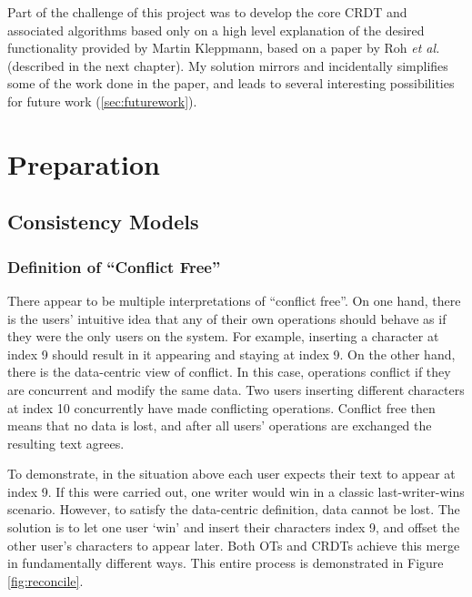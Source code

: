 \documentclass[12pt,a4paper,twoside,openright]{report}
\begin{document}
Part of the challenge of this project was to develop the core CRDT and associated algorithms based only on a high level explanation of the desired functionality provided by Martin Kleppmann, based on a paper by Roh \textit{et al.}~\cite{roh2011replicated} (described in the next chapter). My solution mirrors and incidentally simplifies some of the work done in the paper, and leads to several interesting possibilities for future work (\cref{sec:futurework}). 


\chapter{Preparation}


\section{Consistency Models}

	\subsection{Definition of ``Conflict Free''}
	
	There appear to be multiple interpretations of ``conflict free''. On one hand, there is the users' intuitive idea that any of their own operations should behave as if they were the only users on the system. For example, inserting a character at index 9 should result in it appearing and staying at index 9. On the other hand, there is the data-centric view of conflict. In this case, operations conflict if they are concurrent and modify the same data. Two users inserting different characters at index 10 concurrently have made conflicting operations. Conflict free then means that no data is lost, and after all users' operations are exchanged the resulting text agrees.
	
	To demonstrate, in the situation above each user expects their text to appear at index 9. If this were carried out, one writer would win in a classic last-writer-wins scenario. However, to satisfy the data-centric definition, data cannot be lost. The solution is to let one user `win' and insert their characters index 9, and offset the other user's characters to appear later. Both OTs and CRDTs achieve this merge in fundamentally different ways. This entire process is demonstrated in Figure \ref{fig:reconcile}.
	
\end{document}
